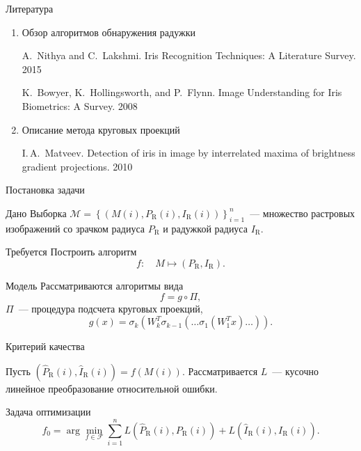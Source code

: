 \documentclass{beamer}
\begin{document}
\begin{frame}{Литература}

\begin{enumerate}
	\item Обзор алгоритмов обнаружения радужки
	
	A.~Nithya and C.~Lakshmi. Iris Recognition Techniques: A Literature Survey. 2015
	
	K.~Bowyer, K.~Hollingsworth, and P.~Flynn. Image Understanding for Iris Biometrics: A Survey. 2008
	
	\item Описание метода круговых проекций
	
	I.\,A.~Matveev. Detection of iris in image by interrelated maxima of brightness gradient projections. 2010
	
\end{enumerate}
\end{frame}

\begin{frame}{Постановка задачи}

\begin{block}{Дано}
Выборка $\mathcal{M} = \left\{\left(M(i), P_\text{R}(i), I_\text{R}(i)\right)\right\}_{i=1}^n$~--- множество растровых изображений со зрачком радиуса $P_\text{R}$ и радужкой радиуса $I_\text{R}$.
\end{block} 

\begin{block}{Требуется}
Построить алгоритм
\[
	f\!: \quad M \mapsto \left(P_\text{R}, I_\text{R}\right).
\]
\end{block}

\begin{block}{Модель}
Рассматриваются алгоритмы вида
\[
f = g \circ \Pi,
\]
$\Pi$~--- процедура подсчета круговых проекций,
\[
g(x) = \sigma_k\left(W_k^T \sigma_{k-1}\left(\ldots \sigma_1\left(W_1^T x\right)\ldots\right)\right).
\] 
\end{block}

\end{frame}

\begin{frame}{Критерий качества}

Пусть $\left(\widehat{P}_\text{R}(i), \widehat{I}_\text{R}(i)\right) = f(M(i))$. Рассматривается $L$~--- кусочно линейное преобразование относительной ошибки.

\begin{block}{Задача оптимизации}
\[
f_0 = \arg\min_{f \in \mathcal{F}} \sum_{i=1}^n L\left(\widehat{P}_\text{R}(i), P_\text{R}(i)\right) + L\left(\widehat{I}_\text{R}(i), I_\text{R}(i)\right).
\]
\end{block}

\end{frame}
\end{document}
